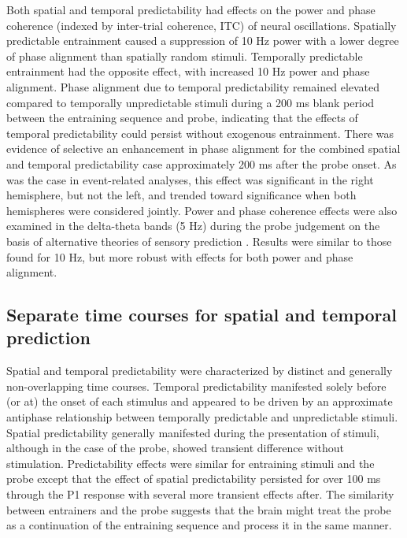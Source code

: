 \documentclass[dwyatte_dissertation.tex]{subfiles}
\begin{document}
Both spatial and temporal predictability had effects on the power and phase coherence (indexed by inter-trial coherence, ITC) of neural oscillations. Spatially predictable entrainment caused a suppression of 10 Hz power with a lower degree of phase alignment than spatially random stimuli. Temporally predictable entrainment had the opposite effect, with increased 10 Hz power and phase alignment. Phase alignment due to temporal predictability remained elevated compared to temporally unpredictable stimuli during a 200 ms blank period between the entraining sequence and probe, indicating that the effects of temporal predictability could persist without exogenous entrainment. There was evidence of selective an enhancement in phase alignment for the combined spatial and temporal predictability case approximately 200 ms after the probe onset. As was the case in event-related analyses, this effect was significant in the right hemisphere, but not the left, and trended toward significance when both hemispheres were considered jointly. Power and phase coherence effects were also examined in the delta-theta bands (5 Hz) during the probe judgement on the basis of alternative theories of sensory prediction \cite{ArnalGiraud12,GiraudPoeppel12}. Results were similar to those found for 10 Hz, but more robust with effects for both power and phase alignment. 

\subsection{Separate time courses for spatial and temporal prediction}
Spatial and temporal predictability were characterized by distinct and generally non-overlapping time courses. Temporal predictability manifested solely before (or at) the onset of each stimulus and appeared to be driven by an approximate antiphase relationship between temporally predictable and unpredictable stimuli. Spatial predictability generally manifested during the presentation of stimuli, although in the case of the probe, showed transient difference without stimulation. Predictability effects were similar for entraining stimuli and the probe except that the effect of spatial predictability persisted for over 100 ms through the P1 response with several more transient effects after. The similarity between entrainers and the probe suggests that the brain might treat the probe as a continuation of the entraining sequence and process it in the same manner. 
\end{document}
